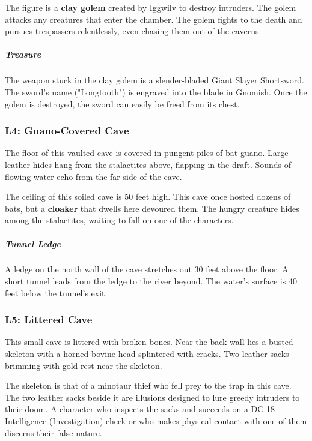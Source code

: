 \documentclass[10pt,a4paper,twoside,bg=print,twocolumn,openany,nodeprecatedcode]{dndbook}
\begin{document}
The figure is a \textbf{clay golem} created by Iggwilv to destroy intruders. The golem attacks any creatures that enter the chamber. The golem fights to the death and pursues trespassers relentlessly, even chasing them out of the caverns.

\subparagraph{Treasure}
The weapon stuck in the clay golem is a slender-bladed Giant Slayer Shortsword. The sword's name ("Longtooth") is engraved into the blade in Gnomish. Once the golem is destroyed, the sword can easily be freed from its chest.

\subsubsection{L4: Guano-Covered Cave}
\begin{DndReadAloud}{}
The floor of this vaulted cave is covered in pungent piles of bat guano. Large leather hides hang from the stalactites above, flapping in the draft. Sounds of flowing water echo from the far side of the cave.

\end{DndReadAloud}

The ceiling of this soiled cave is 50 feet high. This cave once hosted dozens of bats, but a \textbf{cloaker} that dwells here devoured them. The hungry creature hides among the stalactites, waiting to fall on one of the characters.

\subparagraph{Tunnel Ledge}
A ledge on the north wall of the cave stretches out 30 feet above the floor. A short tunnel leads from the ledge to the river beyond. The water's surface is 40 feet below the tunnel's exit.

\subsubsection{L5: Littered Cave}
\begin{DndReadAloud}{}
This small cave is littered with broken bones. Near the back wall lies a busted skeleton with a horned bovine head splintered with cracks. Two leather sacks brimming with gold rest near the skeleton.

\end{DndReadAloud}

The skeleton is that of a minotaur thief who fell prey to the trap in this cave. The two leather sacks beside it are illusions designed to lure greedy intruders to their doom. A character who inspects the sacks and succeeds on a DC 18 Intelligence (Investigation) check or who makes physical contact with one of them discerns their false nature.
\end{document}
